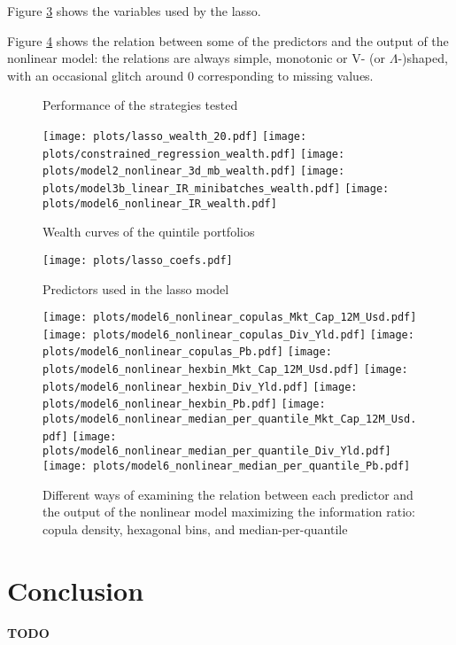 \documentclass[12pt]{article}
\begin{document}
Figure \ref{fig:lasso-coef} shows the variables used by the lasso.

Figure \ref{fig:non-linear} shows the relation between some of the predictors and
the output of the nonlinear model: 
the relations are always simple, monotonic or V- (or $\Lambda$-)shaped,
with an occasional glitch around 0 corresponding to missing values. 

\begin{figure}[htbp]
\centering

\caption{Performance of the strategies tested}
\label{fig:perf}
\end{figure}

\begin{figure}[htbp]
\centering
\texttt{[image: plots/lasso\_wealth\_20.pdf]}%
\texttt{[image: plots/constrained\_regression\_wealth.pdf]}
\texttt{[image: plots/model2\_nonlinear\_3d\_mb\_wealth.pdf]}
\texttt{[image: plots/model3b\_linear\_IR\_minibatches\_wealth.pdf]}
\texttt{[image: plots/model6\_nonlinear\_IR\_wealth.pdf]}%
\caption{Wealth curves of the quintile portfolios}
\label{fig:wealth-curves}
\end{figure}

\begin{figure}[htbp]
\centering
\texttt{[image: plots/lasso\_coefs.pdf]}%
\caption{Predictors used in the lasso model}
\label{fig:lasso-coef}
\end{figure}

\begin{figure}[htbp]
\centering
\texttt{[image: plots/model6\_nonlinear\_copulas\_Mkt\_Cap\_12M\_Usd.pdf]}%
\texttt{[image: plots/model6\_nonlinear\_copulas\_Div\_Yld.pdf]}%
\texttt{[image: plots/model6\_nonlinear\_copulas\_Pb.pdf]}
\texttt{[image: plots/model6\_nonlinear\_hexbin\_Mkt\_Cap\_12M\_Usd.pdf]}%
\texttt{[image: plots/model6\_nonlinear\_hexbin\_Div\_Yld.pdf]}%
\texttt{[image: plots/model6\_nonlinear\_hexbin\_Pb.pdf]}
\texttt{[image: plots/model6\_nonlinear\_median\_per\_quantile\_Mkt\_Cap\_12M\_Usd.pdf]}%
\texttt{[image: plots/model6\_nonlinear\_median\_per\_quantile\_Div\_Yld.pdf]}%
\texttt{[image: plots/model6\_nonlinear\_median\_per\_quantile\_Pb.pdf]}
\caption{Different ways of examining the relation between each predictor and the output
of the nonlinear model maximizing the information ratio: copula density, hexagonal bins, 
and median-per-quantile}
\label{fig:non-linear}
\end{figure}

\clearpage
\section{Conclusion}

\textbf{TODO}


\clearpage
\nocite{*}


\end{document}
